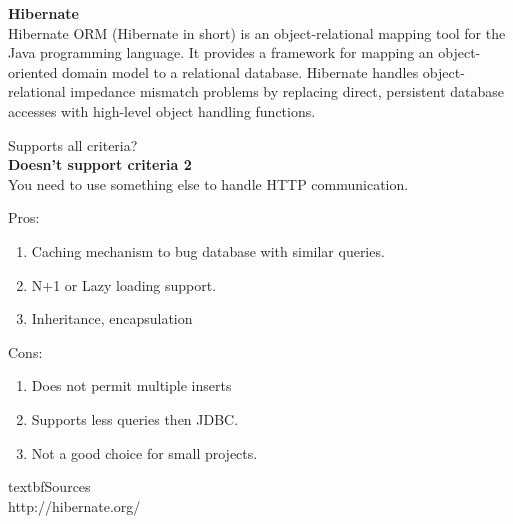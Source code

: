 		\textbf{Hibernate} \\
		Hibernate ORM (Hibernate in short) is an object-relational mapping tool for the Java programming language. It provides a framework for mapping an object-oriented domain model to a relational database. Hibernate handles object-relational impedance mismatch problems by replacing direct, persistent database accesses with high-level object handling functions.
		
		Supports all criteria?\\
		\textbf{Doesn't support criteria 2}\\
		You need to use something else to handle HTTP communication.
		
		Pros:
		\begin{enumerate}
		\item Caching mechanism to bug database with similar queries.
		\item N+1 or Lazy loading support.
		\item Inheritance, encapsulation
		\end{enumerate}
		Cons:
		\begin{enumerate}
		\item Does not permit multiple inserts
		\item Supports less queries then JDBC.
		\item Not a good choice for small projects.
		\end{enumerate}
	
	textbf{Sources}\\
	http://hibernate.org/